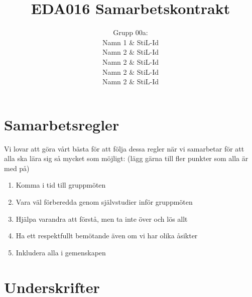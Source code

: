 \documentclass[11pt]{article} %
\title{EDA016 Samarbetskontrakt}
\author{Grupp 00a: \\ 
Namn 1 \& StiL-Id \\ 
Namn 2 \& StiL-Id \\ 
Namn 2 \& StiL-Id \\ 
Namn 2 \& StiL-Id \\ 
Namn 2 \& StiL-Id \\ 
}
\begin{document}
\maketitle

\section{Samarbetsregler}
Vi lovar att göra vårt bästa för att följa dessa regler när vi samarbetar för att alla ska lära sig så mycket som möjligt: (lägg gärna till fler punkter som alla är med på)
\begin{enumerate}
\item Komma i tid till gruppmöten
\item Vara väl förberedda genom självstudier inför gruppmöten
\item Hjälpa varandra att förstå, men ta inte över och lös allt
\item Ha ett respektfullt bemötande även om vi har olika åsikter
\item Inkludera alla i gemenskapen
\end{enumerate}

\section{Underskrifter}
\end{document}
